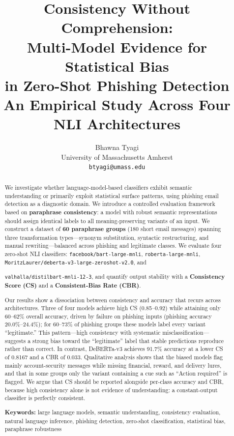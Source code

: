 \documentclass[11pt]{article}
\title{\textbf{Consistency Without Comprehension:\\[4pt]
Multi-Model Evidence for Statistical Bias\\[2pt]
in Zero-Shot Phishing Detection}\\[6pt]
\large An Empirical Study Across Four NLI Architectures}
\author{
  Bhawna Tyagi \\
  University of Massachusetts Amherst \\
  \texttt{btyagi@umass.edu}
}
\date{}
\begin{document}
\maketitle

\begin{abstract}
We investigate whether language-model-based classifiers exhibit semantic understanding or primarily exploit statistical surface patterns, using phishing email detection as a diagnostic domain. We introduce a controlled evaluation framework based on \textbf{paraphrase consistency}: a model with robust semantic representations should assign identical labels to all meaning-preserving variants of an input. We construct a dataset of \textbf{60 paraphrase groups} (180 short email messages) spanning three transformation types---synonym substitution, syntactic restructuring, and manual rewriting---balanced across phishing and legitimate classes. We evaluate four zero-shot NLI classifiers: \texttt{facebook/bart-large-mnli}, \texttt{roberta-large-mnli}, \texttt{MoritzLaurer/deberta-v3-large-zeroshot-v2.0}, and 

\texttt{valhalla/distilbart-mnli-12-3}, and quantify output stability with a \textbf{Consistency Score (CS)} and a \textbf{Consistent-Bias Rate (CBR)}.

Our results show a dissociation between consistency and accuracy that recurs across architectures. Three of four models achieve high CS (0.85--0.92) while attaining only 60--62\% overall accuracy, driven by failure on phishing inputs (phishing accuracy 20.0\%--24.4\%); for 60--73\% of phishing groups these models label every variant ``legitimate.'' This pattern---high consistency with systematic misclassification---suggests a strong bias toward the ``legitimate'' label that stable predictions reproduce rather than correct. In contrast, DeBERTa-v3 achieves 91.7\% accuracy at a lower CS of 0.8167 and a CBR of 0.033. Qualitative analysis shows that the biased models flag mainly account-security messages while missing financial, reward, and delivery lures, and that in some groups only the variant containing a cue such as ``Action required'' is flagged. We argue that CS should be reported alongside per-class accuracy and CBR, because high consistency alone is not evidence of understanding: a constant-output classifier is perfectly consistent.

\smallskip
\noindent\textbf{Keywords:} large language models, semantic understanding, consistency evaluation, natural language inference, phishing detection, zero-shot classification, statistical bias, paraphrase robustness
\end{abstract}
\end{document}
